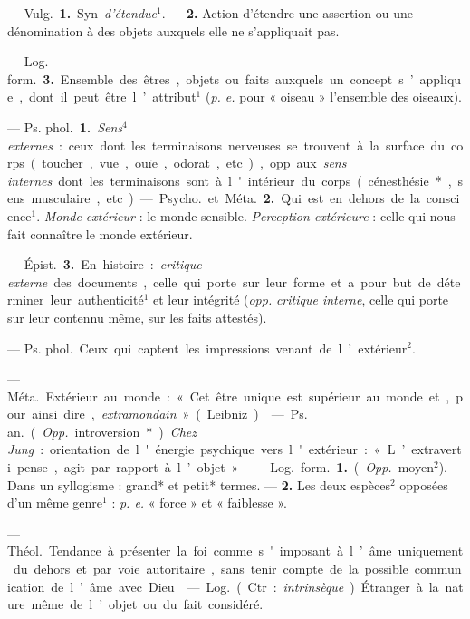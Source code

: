 \begin{itemize}[leftmargin=1cm, label=, itemsep=1pt]
 — \si{Vulg.} {\bf 1.} Syn. {\it d’étendue}$^1$.
— {\bf 2.} Action d'étendre une assertion ou une dénomination à des
objets auxquels elle ne s’appliquait
pas.

— \si{Log. form.} {\bf 3.} Ensemble des êtres, objets ou faits auxquels un
concept s’applique, dont il peut être l’attribut$^1$ ({\it p. e.} pour
« oiseau » l’ensemble des oiseaux).

 — \si{Ps. phol.} {\bf 1.}
{\it Sens$^4$ externes} : ceux dont les terminaisons nerveuses se trouvent à
la surface du corps (toucher, vue,
ouïe, odorat, etc.), opp. aux {\it sens
internes} dont les terminaisons sont
à l'intérieur du corps (cénesthésie*,
sens musculaire, etc.).

— \si{Psycho.} et \si{Méta.} {\bf 2.} Qui est en
dehors de la conscience$^1$. {\it Monde extérieur} : le monde sensible.
{\it Perception extérieure} : celle qui nous fait
connaître le monde extérieur.

— \si{Épist.} {\bf 3.} En histoire : {\it critique
externe} des documents, celle qui porte sur leur forme et a pour but
de déterminer leur authenticité$^1$ et
leur intégrité ({\it opp.} {\it critique interne},
celle qui porte sur leur contennu même, sur les faits attestés).

 — \si{Ps. phol.}
Ceux qui captent les impressions venant de l’extérieur$^2$.

 — \si{Méta.} Extérieur au
monde : « Cet être unique est supérieur au monde et, pour ainsi dire,
{\it extramondain} » (Leibniz).

 — \si{Ps. an.} ({\it Opp.}
introversion*) {\it Chez Jung} : orientation de l'énergie psychique vers
l'extérieur : « L’extraverti pense, agit par rapport à l’objet. »

 — \si{Log.} \si{form.} {\bf 1.} ({\it Opp.}
moyen$^2$). Dans un syllogisme : grand* et petit* termes.
— {\bf 2.} Les deux espèces$^2$ opposées d’un même genre$^1$ :
{\it p. e.} « force » et « faiblesse ».

 — \si{Théol.} Tendance à présenter la foi comme
s'imposant à l’âme uniquement du dehors et par voie autoritaire, sans
tenir compte de la possible communication de l’âme avec Dieu.

 — \si{Log.} (Ctr. : {\it intrinsèque}) Étranger à la
nature même de l’objet ou du fait considéré.

	\end{itemize}
